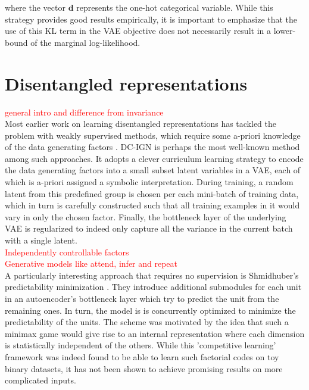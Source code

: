 \documentclass{report}
\newcommand\todo[1]{\textcolor{red}{#1}}
\begin{document}
\bigskip

\noindent where the vector $\boldsymbol{d}$ represents the one-hot categorical variable. While this strategy provides good results empirically, it is important to emphasize that the use of this KL term in the VAE objective does not necessarily result in a lower-bound of the marginal log-likelihood.

\section{Disentangled representations}

\todo{general intro and difference from invariance} \\

\noindent Most earlier work on learning disentangled representations has tackled the problem with weakly supervised methods, which require some a-priori knowledge of the data generating factors \cite{transforming-ae, reed2014, yang2016}. DC-IGN \cite{dcign} is perhaps the most well-known method among such approaches. It adopts a clever curriculum learning \cite{bengio-curriculum} strategy to encode the data generating factors into a small subset latent variables in a VAE, each of which is a-priori assigned a symbolic interpretation. During training, a random latent from this predefined group is chosen per each mini-batch of training data, which in turn is carefully constructed such that all training examples in it would vary in only the chosen factor. Finally, the bottleneck layer of the underlying VAE is regularized to indeed only capture all the variance in the current batch with a single latent. \\

\noindent \todo{Independently controllable factors} \\

\noindent \todo{Generative models like attend, infer and repeat} \\

\noindent A particularly interesting approach that requires no supervision is Shmidhuber's predictability minimization \cite{pred-min-schmidhuber}. They introduce additional submodules for each unit in an autoencoder's bottleneck layer which try to predict the unit from the remaining ones. In turn, the model is is concurrently optimized to minimize the predictability of the units. The scheme was motivated by the idea that such a minimax game would give rise to an internal representation where each dimension is statistically independent of the others. While this 'competitive learning' framework was indeed found to be able to learn such factorial codes on toy binary datasets, it has not been shown to achieve promising results on more complicated inputs. \\
\end{document}
